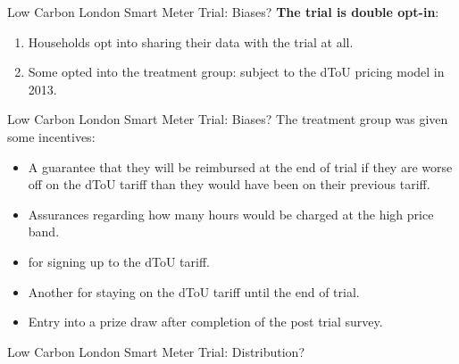 \documentclass{beamer}
\begin{document}
\begin{frame}{Low Carbon London Smart Meter Trial: Biases?}
  \textbf{The trial is double opt-in}:
  \begin{enumerate}
    \item<+-> Households opt into sharing their data with the trial at all.
    \item<+-> Some opted into the treatment group: subject to the dToU pricing model in 2013.
  \end{enumerate}
\end{frame}

\begin{frame}{Low Carbon London Smart Meter Trial: Biases?}
  The treatment group was given some incentives: 
  \begin{itemize}
    \item A guarantee that they will be reimbursed at the end of trial if they are worse off on the dToU tariff than they would have been on their previous tariff.
    \item Assurances regarding how many hours would be charged at the high price band.
    \item {} for signing up to the dToU tariff.
    \item Another  for staying on the dToU tariff until the end of trial.
    \item Entry into a prize draw after completion of the post trial survey.
  \end{itemize}
\end{frame}

\begin{frame}{Low Carbon London Smart Meter Trial: Distribution?}
  \begin{figure}
    \centering
    \qquad
  \end{figure}
\end{frame}
\end{document}
